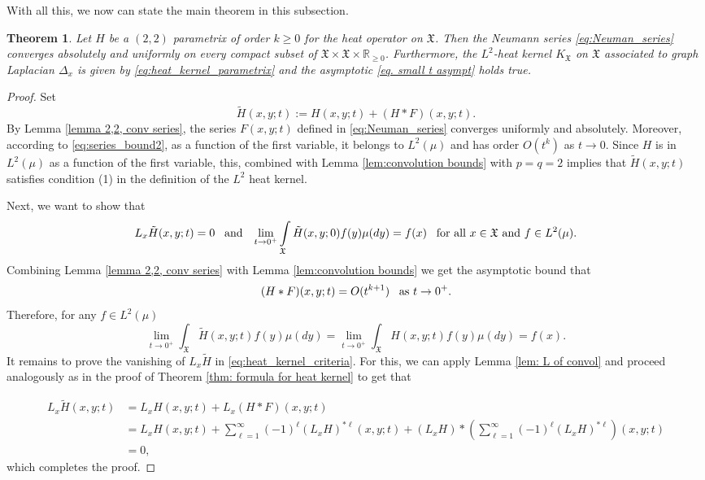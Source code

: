 \documentclass[11pt,reqno]{amsart}
\newtheorem{theorem}{Theorem}
\theoremstyle{remark}
\theoremstyle{definition}
\numberwithin{theorem}{section} \numberwithin{equation}{section}
\newcommand{\X}{\mathfrak{X}}
\begin{document}
With all this, we now can state the main theorem in this subsection.

\begin{theorem}
\label{thm: formula for heat kernel 2} Let $H$ be a $(2,2)$ parametrix of
order $k\geq0$ for the heat operator on $\X$.
Then the Neumann series \eqref{eq:Neuman_series}
converges absolutely and uniformly on every compact subset of $\X\times \X\times\mathbb{R}_{\geq 0}$.
Furthermore, the $L^2$-heat kernel $K_{\X}$ on $\X$
associated to graph Laplacian $\Delta_{x}$ is given by \eqref{eq:heat_kernel_parametrix} and the asymptotic \eqref{eq. small t asympt} holds true.
\end{theorem}

\begin{proof}
Set
$$
\tilde{H}(x,y;t) := H(x,y;t)+(H\ast F)(x,y;t).
$$
By Lemma \ref{lemma 2,2, conv series}, the series $F(x,y;t)$ defined in \eqref{eq:Neuman_series}
converges uniformly and absolutely. Moreover, according to \eqref{eq:series_bound2}, as a function of the first variable, it belongs to $L^2(\mu)$ and has order $O(t^{k})$ as $t \rightarrow 0$.  Since $H$ is in $L^2(\mu)$ as a function of the first variable, this, combined with Lemma \ref{lem:convolution bounds} with $p=q=2$ implies that $\tilde{H}(x,y;t)$ satisfies condition (1) in the definition of the $L^2$ heat kernel.

Next, we want to show that
\begin{equation}\label{eq:heat_kernel_criteria}
L_{x}\tilde{H}(x,y;t)=0
\,\,\,\,\,
\text{\rm and}
\,\,\,\,\,
\lim_{t\rightarrow 0^+}\int\limits_{\X}\tilde H(x,y;0)f(y)\mu(dy)=f(x)
\,\,\,\,\,
\text{\rm for all $x\in\X$ and $f\in L^2(\mu)$.}
\end{equation}
Combining Lemma \ref{lemma 2,2, conv series} with Lemma \ref{lem:convolution bounds} we get the asymptotic bound that
$$
(H\ast F)(x,y;t)= O(t^{k+1})
\,\,\,\,\,
\text{\rm as $t \rightarrow 0^+$.}
$$
Therefore, for any $f\in L^2(\mu)$
$$
\lim_{t\to 0^+} \int_{\X}\tilde{H}(x,y;t)f(y)\mu(dy) =\lim_{t\to 0^+} \int_{\X}H(x,y;t)f(y)\mu(dy)=f(x).
$$
It remains to prove the vanishing of $L_{x}\tilde{H}$ in \eqref{eq:heat_kernel_criteria}.
For this, we can apply Lemma \ref{lem: L of convol}  and proceed analogously as in the proof of  Theorem \ref{thm: formula for heat kernel} to get that

\begin{align*}
L_{x}\tilde{H}(x,y;t)&=
L_{x}H(x,y;t)+L_{x}(H\ast F)(x,y;t)
\\&=
L_{x}H(x,y;t)+\sum_{\ell=1}^{\infty}(-1)^{\ell}(L_{x}
{H})^{\ast\ell}(x,y;t)+(L_{x}{H})*\left(\sum_{\ell=1}^{\infty}(-1)^{\ell}(L_{x}{H})^{\ast\ell}\right)(x,y;t)\\
&
=0,
\end{align*}
which completes the proof.
\end{proof}
\end{document}

